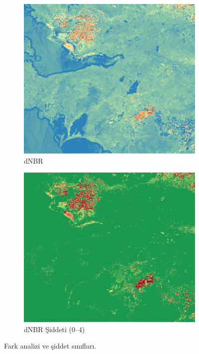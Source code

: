 \documentclass[11pt,a4paper]{article}
\begin{document}
\begin{figure}[H]
  \centering
  \begin{subfigure}[b]{0.48\textwidth}
    \centering
    \includegraphics[width=\textwidth]{../results/dNBR.png}
    \caption{dNBR}
  \end{subfigure}\hfill
  \begin{subfigure}[b]{0.48\textwidth}
    \centering
    \includegraphics[width=\textwidth]{../results/severity.png}
    \caption{dNBR Şiddeti (0--4)}
  \end{subfigure}
  \caption{Fark analizi ve şiddet sınıfları.}
  \label{fig:diffs}
\end{figure}
\FloatBarrier
\end{document}
